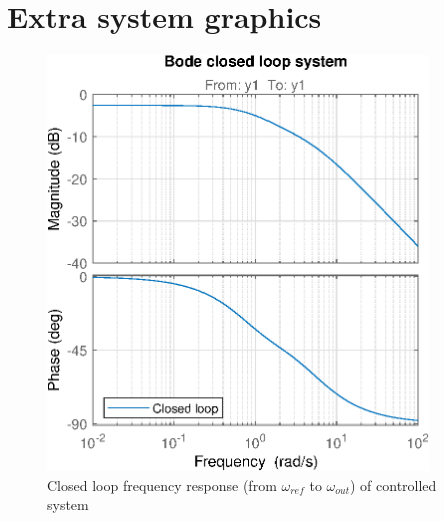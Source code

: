 \chapter{Extra system graphics}
\begin{figure}[h]
    \centering
    \includegraphics[width=0.9\textwidth]{figures/appendix/bode_closed_loop.eps}
    \caption{Closed loop frequency response (from $\omega_{ref}$ to $\omega_{out}$) of controlled system}
    \label{fig:systemcontrollerbode}
\end{figure}

